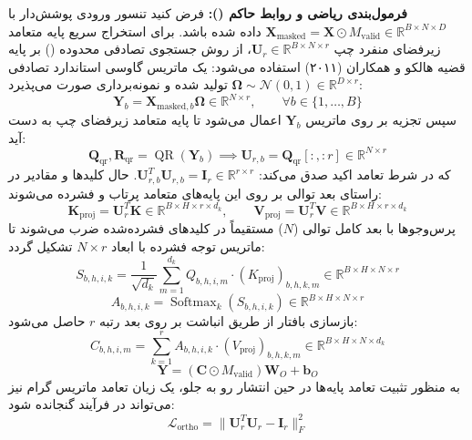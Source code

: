 \textbf{فرمول‌بندی ریاضی و روابط حاکم ():}
فرض کنید تنسور ورودی پوشش‌دار با $\mathbf{X}_{\text{masked}} = \mathbf{X} \odot M_{\text{valid}} \in \mathbb{R}^{B \times N \times D}$ داده شده باشد. برای استخراج سریع پایه متعامد زیرفضای منفرد چپ $\mathbf{U}_r \in \mathbb{R}^{B \times N \times r}$، از روش جستجوی تصادفی محدوده () بر پایه قضیه هالکو و همکاران (۲۰۱۱) استفاده می‌شود:
یک ماتریس گاوسی استاندارد تصادفی $\mathbf{\Omega} \sim \mathcal{N}(0, 1) \in \mathbb{R}^{D \times r}$ تولید شده و نمونه‌برداری صورت می‌پذیرد:
\begin{equation}
\mathbf{Y}_b = \mathbf{X}_{\text{masked}, b} \mathbf{\Omega} \in \mathbb{R}^{N \times r}, \qquad \forall b \in \{1, \dots, B\}
\end{equation}
سپس تجزیه  بر روی ماتریس $\mathbf{Y}_b$ اعمال می‌شود تا پایه متعامد زیرفضای چپ به دست آید:
\begin{equation}
\mathbf{Q}_{\text{qr}}, \mathbf{R}_{\text{qr}} = \operatorname{QR}(\mathbf{Y}_b) \implies \mathbf{U}_{r, b} = \mathbf{Q}_{\text{qr}}[:, :r] \in \mathbb{R}^{N \times r}
\end{equation}
که در شرط تعامد اکید صدق می‌کند: $\mathbf{U}_{r, b}^T \mathbf{U}_{r, b} = \mathbf{I}_r \in \mathbb{R}^{r \times r}$.
حال کلیدها و مقادیر در راستای بعد توالی بر روی این پایه‌های متعامد پرتاب و فشرده می‌شوند:
\begin{equation}
\mathbf{K}_{\text{proj}} = \mathbf{U}_r^T \mathbf{K} \in \mathbb{R}^{B \times H \times r \times d_k}, \qquad
\mathbf{V}_{\text{proj}} = \mathbf{U}_r^T \mathbf{V} \in \mathbb{R}^{B \times H \times r \times d_k}
\end{equation}
پرس‌وجوها با بعد کامل توالی ($N$) مستقیماً در کلیدهای فشرده‌شده ضرب می‌شوند تا ماتریس توجه فشرده با ابعاد $N \times r$ تشکیل گردد:
\begin{equation}
S_{b, h, i, k} = \frac{1}{\sqrt{d_k}} \sum_{m=1}^{d_k} Q_{b, h, i, m} \cdot (K_{\text{proj}})_{b, h, k, m} \in \mathbb{R}^{B \times H \times N \times r}
\end{equation}
\begin{equation}
A_{b, h, i, k} = \operatorname{Softmax}_k (S_{b, h, i, k}) \in \mathbb{R}^{B \times H \times N \times r}
\end{equation}
بازسازی بافتار از طریق انباشت بر روی بعد رتبه $r$ حاصل می‌شود:
\begin{equation}
C_{b, h, i, m} = \sum_{k=1}^r A_{b, h, i, k} \cdot (V_{\text{proj}})_{b, h, k, m} \in \mathbb{R}^{B \times H \times N \times d_k}
\end{equation}
\begin{equation}
\mathbf{Y} = (\mathbf{C} \odot M_{\text{valid}}) \mathbf{W}_O + \mathbf{b}_O
\end{equation}
به منظور تثبیت تعامد پایه‌ها در حین انتشار رو به جلو، یک زیان تعامد ماتریس گرام نیز می‌تواند در فرآیند گنجانده شود:
\begin{equation}
\mathcal{L}_{\text{ortho}} = \|\mathbf{U}_r^T \mathbf{U}_r - \mathbf{I}_r\|_F^2
\end{equation}


